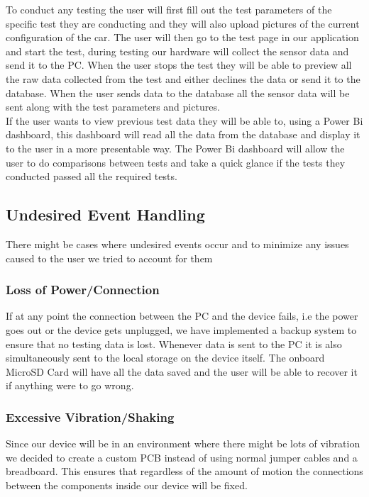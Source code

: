\documentclass[12pt, titlepage]{article}
\begin{document}
To conduct any testing the user will first fill out the test parameters of the specific test they are conducting and they will also upload pictures of the current configuration of the car. The user will then go to the test page in our application and start the test, during testing our hardware will collect the sensor data and send it to the PC. When the user stops the test they will be able to preview all the raw data collected from the test and either declines the data or send it to the database. When the user sends data to the database all the sensor data will be sent along with the test parameters and pictures.\\

If the user wants to view previous test data they will be able to, using a Power Bi dashboard, this dashboard will read all the data from the database and display it to the user in a more presentable way. The Power Bi dashboard will allow the user to do comparisons between tests and take a quick glance if the tests they conducted passed all the required tests.

\subsection{Undesired Event Handling}
There might be cases where undesired events occur and to minimize any issues caused to the user we tried to account for them
\subsubsection{Loss of Power/Connection}
If at any point the connection between the PC and the device fails, i.e the power goes out or the device gets unplugged, we have implemented a backup system to ensure that no testing data is lost. Whenever data is sent to the PC it is also simultaneously sent to the local storage on the device itself. The onboard MicroSD Card will have all the data saved and the user will be able to recover it if anything were to go wrong.

\subsubsection{Excessive Vibration/Shaking}
Since our device will be in an environment where there might be lots of vibration we decided to create a custom PCB instead of using normal jumper cables and a breadboard. This ensures that regardless of the amount of motion the connections between the components inside our device will be fixed.
\end{document}
